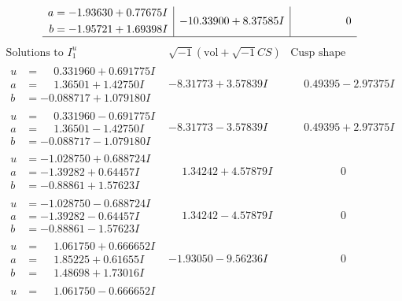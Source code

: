 \documentclass[1p]{elsarticle_modified}
\theoremstyle{definition}
\newcommand{\I}{\sqrt{-1}}
\begin{document}
$$\begin{array}{c|c|c}
\begin{aligned}
a &= -1.93630 + 0.77675 I \\
b &= -1.95721 + 1.69398 I\end{aligned}
 & -10.33900 + 8.37585 I & \phantom{-0.000000 } 0\\
 \hline 
 \end{array}$$\newpage$$\begin{array}{c|c|c}  
\text{Solutions to }I^u_{1}& \I (\text{vol} + \sqrt{-1}CS) & \text{Cusp shape}\\
 \hline 
\begin{aligned}
u &= \phantom{-}0.331960 + 0.691775 I \\
a &= \phantom{-}1.36501 + 1.42750 I \\
b &= -0.088717 + 1.079180 I\end{aligned}
 & -8.31773 + 3.57839 I & \phantom{-}0.49395 - 2.97375 I \\ \hline\begin{aligned}
u &= \phantom{-}0.331960 - 0.691775 I \\
a &= \phantom{-}1.36501 - 1.42750 I \\
b &= -0.088717 - 1.079180 I\end{aligned}
 & -8.31773 - 3.57839 I & \phantom{-}0.49395 + 2.97375 I \\ \hline\begin{aligned}
u &= -1.028750 + 0.688724 I \\
a &= -1.39282 + 0.64457 I \\
b &= -0.88861 + 1.57623 I\end{aligned}
 & \phantom{-}1.34242 + 4.57879 I & \phantom{-0.000000 } 0 \\ \hline\begin{aligned}
u &= -1.028750 - 0.688724 I \\
a &= -1.39282 - 0.64457 I \\
b &= -0.88861 - 1.57623 I\end{aligned}
 & \phantom{-}1.34242 - 4.57879 I & \phantom{-0.000000 } 0 \\ \hline\begin{aligned}
u &= \phantom{-}1.061750 + 0.666652 I \\
a &= \phantom{-}1.85225 + 0.61655 I \\
b &= \phantom{-}1.48698 + 1.73016 I\end{aligned}
 & -1.93050 - 9.56236 I & \phantom{-0.000000 } 0 \\ \hline\begin{aligned}
u &= \phantom{-}1.061750 - 0.666652 I \\

\end{aligned}
\end{array}$$
\end{document}
